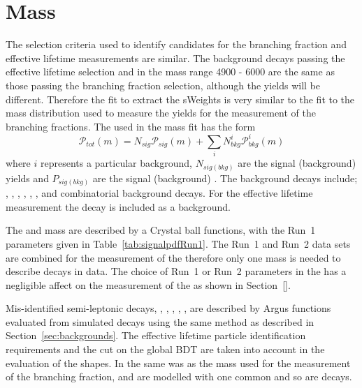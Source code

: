 \section{Mass \pdfs}
\label{sec:ELmasspdfs}
The selection criteria used to identify \bsmumu candidates for the \bmumu branching fraction and \bsmumu effective lifetime measurements are similar. 
The background decays passing the \bsmumu effective lifetime selection and in the mass range 4900 - 6000 \mevcc are the same as those passing the branching fraction selection, although the yields will be different.%
Therefore the \ml fit to extract the sWeights is very similar to the fit to the mass distribution used to measure the \bmumu yields for the measurement of the \bmumu branching fractions. The \pdf used in the mass fit has the form
\begin{equation}
\mathcal{P}_{tot}(m) = N_{sig}\mathcal{P}_{sig}(m) + \displaystyle\sum_{i} N^i_{bkg}\mathcal{P}^i_{bkg}(m)
\label{eq:masspdf}
\end{equation}
where $i$ represents a particular background, $N_{sig(bkg)}$ are the signal (background) yields and $P_{sig(bkg)}$ are the signal (background) \pdfs. The background decays include; \bdmumu, \bhh, \lambdab, \bdpimunu, \bsKmunu, \bpimumu, \bcjpsimunu and combinatorial background decays. For the effective lifetime measurement the \bdmumu decay is included as a background. 



The \bsmumu and \bdmumu mass \pdfs are described by a Crystal ball functions, with the Run~1 parameters given in Table~\ref{tab:signalpdfRun1}. The Run~1 and Run~2 data sets are combined for the measurement of the \bsmumu \el therefore only one mass \pdf is needed to describe \bmumu decays in data. The choice of Run~1 or Run~2 parameters in the \pdf has a negligible affect on the measurement of the \bsmumu \el as shown in Section~\ref{}.

Mis-identified semi-leptonic decays, \lambdab, \bdpimunu, \bsKmunu, \bpimumu, \bcjpsimunu,  are described by Argus functions evaluated from simulated decays using the same method as described in Section~\ref{sec:backgrounds}. The effective lifetime particle identification requirements and the cut on the global BDT are taken into account in the evaluation of the \pdf shapes. In the same was as the mass \pdfs used for the measurement of the \bmumu branching fraction, \bdpimunu and \bsKmunu are modelled with one common \pdf and so are \bpimumu decays.

